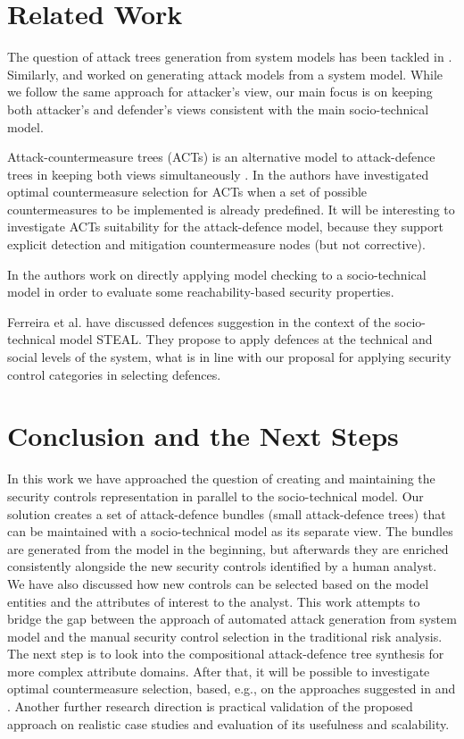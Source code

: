 \documentclass{llncs}
\begin{document}
\section{Related Work}\label{sec:discussion}
The question of attack trees generation from system models has been tackled in \cite{Ivanova-Generation-2014}. Similarly, \cite{Vigo-CSF-2014} and \cite{Ou-CCS-2006} worked on generating attack models from a system model. While we follow the same approach for  attacker's view, our main focus is on keeping both attacker's and defender's views consistent with the main socio-technical model.  

Attack-countermeasure trees (ACTs) is an alternative model to attack-defence trees in keeping both views simultaneously \cite{Roy-SCN-2011}. In \cite{Roy-DSN-2012} the authors have investigated optimal countermeasure selection for ACTs when a set of possible countermeasures to be implemented is already predefined. It will be interesting to investigate ACTs suitability for the attack-defence model, because they support explicit detection and mitigation countermeasure nodes (but not corrective). 

In \cite{Lenzini-2015} the authors work on directly applying model checking to a socio-technical model in order to evaluate some reachability-based security properties. 

Ferreira et al. \cite{STEAL-2014} have discussed defences suggestion in the context of the socio-technical model STEAL. They propose to apply defences at the technical and social levels of the system, what is in line with our proposal for applying security control categories in selecting defences.

\section{Conclusion and the Next Steps}

In this work we have approached the question of creating and maintaining the security controls representation in parallel to the socio-technical model. Our solution creates a set of attack-defence bundles (small attack-defence trees) that can be maintained with a socio-technical model as its separate view. The bundles are generated from the model in the beginning, but afterwards they are enriched consistently alongside the new security controls identified by a human analyst. We have also discussed how new controls can be selected based on the model entities and the attributes of interest to the analyst. This work attempts to bridge the gap between the approach of automated attack generation from system model and the manual security control selection in the traditional risk analysis. The next step is to look into the compositional attack-defence tree synthesis for more complex attribute domains.  After that, it will be possible to investigate optimal countermeasure selection, based, e.g., on the approaches suggested in \cite{Aslanyan-POST-2015} and \cite{Roy-DSN-2012}. Another further research direction is practical validation of the proposed approach on realistic case studies and evaluation of its usefulness and scalability.
\end{document}
